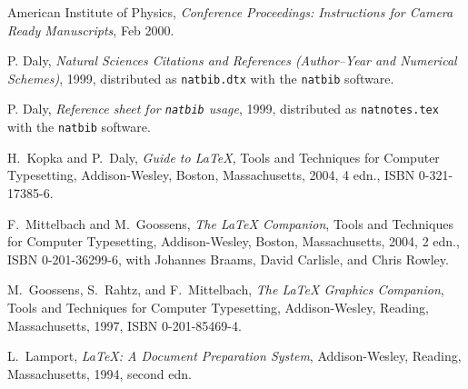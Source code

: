 \begin{thebibliography}{1}

American Institute of Physics, \emph{Conference Proceedings: Instructions for
  Camera Ready Manuscripts}, Feb 2000.

P. Daly, \emph{Natural Sciences Citations and References
  (Author--Year and Numerical Schemes)},
  1999, distributed as \texttt{natbib.dtx} with the \texttt{natbib} software.

P. Daly, \emph{Reference sheet for \texttt{natbib} usage},
  1999, distributed as \texttt{natnotes.tex} with the  \texttt{natbib}
  software.

H.~Kopka and P.~Daly, \emph{Guide to {\LaTeX}}, Tools and
  Techniques for Computer Typesetting, Addison-Wesley, Boston, Massachusetts,
  2004, 4 edn., ISBN 0-321-17385-6.

F.~Mittelbach and M.~Goossens, \emph{The {\LaTeX} Companion}, Tools and
  Techniques for Computer Typesetting, Addison-Wesley, Boston, Massachusetts,
  2004, 2 edn., ISBN 0-201-36299-6, with Johannes Braams, David Carlisle, and
  Chris Rowley.

M.~Goossens, S.~Rahtz, and F.~Mittelbach, \emph{The {\LaTeX} Graphics
  Companion}, Tools and Techniques for Computer Typesetting, Addison-Wesley,
  Reading, Massachusetts, 1997, ISBN 0-201-85469-4.

L.~Lamport, \emph{{\LaTeX:} A Document Preparation System}, Addison-Wesley,
  Reading, Massachusetts, 1994, second edn.

\end{thebibliography}

\endinput
